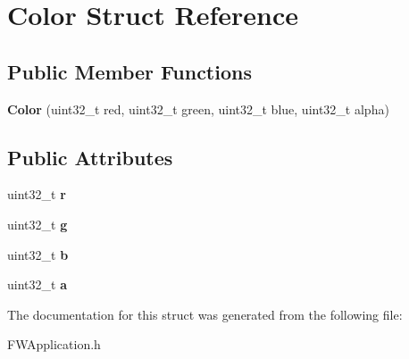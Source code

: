 \hypertarget{struct_color}{\section{Color Struct Reference}
\label{struct_color}
}
\subsection*{Public Member Functions}
\begin{DoxyCompactItemize}
\item 
\hypertarget{struct_color_ae47bf1bef1dfe52a8300239e46b50122}{{\bfseries Color} (uint32\+\_\+t red, uint32\+\_\+t green, uint32\+\_\+t blue, uint32\+\_\+t alpha)}\label{struct_color_ae47bf1bef1dfe52a8300239e46b50122}

\end{DoxyCompactItemize}
\subsection*{Public Attributes}
\begin{DoxyCompactItemize}
\item 
\hypertarget{struct_color_a3249a9e784a2f087bde25f9c3cf2700d}{uint32\+\_\+t {\bfseries r}}\label{struct_color_a3249a9e784a2f087bde25f9c3cf2700d}

\item 
\hypertarget{struct_color_a6b92bc7134b6e016d2a04813cad97638}{uint32\+\_\+t {\bfseries g}}\label{struct_color_a6b92bc7134b6e016d2a04813cad97638}

\item 
\hypertarget{struct_color_a24ff460ba4d95b3ff221757e6fd8246e}{uint32\+\_\+t {\bfseries b}}\label{struct_color_a24ff460ba4d95b3ff221757e6fd8246e}

\item 
\hypertarget{struct_color_a5522bf0c5397a8e0e05b0cccc291b510}{uint32\+\_\+t {\bfseries a}}\label{struct_color_a5522bf0c5397a8e0e05b0cccc291b510}

\end{DoxyCompactItemize}


The documentation for this struct was generated from the following file\+:\begin{DoxyCompactItemize}
\item 
F\+W\+Application.\+h\end{DoxyCompactItemize}
